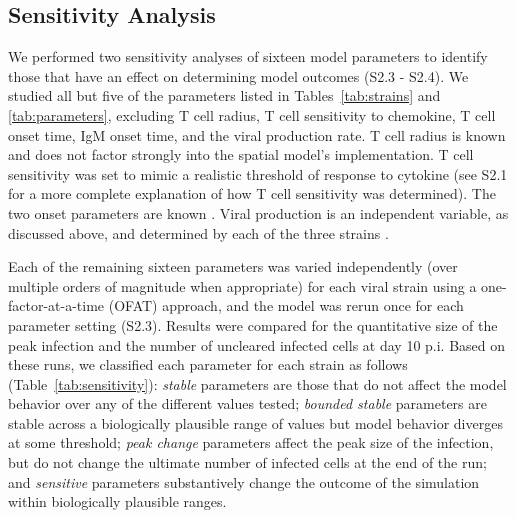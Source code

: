 \documentclass[preprint,10pt,numbers]{elsarticle}
\begin{document}


\subsection*{Sensitivity Analysis}


We performed two sensitivity analyses of sixteen model parameters to identify those that have an effect on determining model outcomes (S2.3 - S2.4). We studied all but five of the parameters listed in Tables~\ref{tab:strains} and \ref{tab:parameters}, excluding T cell radius, T cell sensitivity to chemokine, T cell onset time, IgM onset time, and the viral production rate.  T cell radius is known \citep{abbas2011cellular} and does not factor strongly into the spatial model's implementation.  T cell sensitivity was set to mimic a realistic threshold of response to cytokine (see S2.1 for a more complete explanation of how T cell sensitivity was determined).  The two onset parameters are known \citep{Diamond2003}.  Viral production is an independent variable, as discussed above, and determined by each of the three strains \citep{Mitchell2011}.

Each of the remaining sixteen parameters was varied independently (over multiple orders of magnitude when appropriate) for each viral strain using a one-factor-at-a-time (OFAT) approach, and the model was rerun once for each parameter setting (S2.3).  Results were compared for the quantitative size of the peak infection and the number of uncleared infected cells at day 10 p.i.  Based on these runs, we classified each parameter for each strain as follows (Table~\ref{tab:sensitivity}): \textit{stable} parameters are those that do not affect the model behavior over any of the different values tested; \textit{bounded stable} parameters are stable across a biologically plausible range of values but model behavior diverges at some threshold; \textit{peak change} parameters affect the peak size of the infection, but do not change the ultimate number of infected cells at the end of the run; and \textit{sensitive} parameters substantively change the outcome of the simulation within biologically plausible ranges.  
\end{document}
